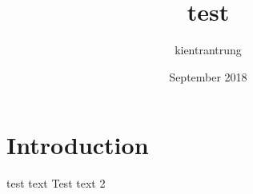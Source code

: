 \documentclass{article}
\title{test}
\author{kientrantrung }
\date{September 2018}
\begin{document}
\maketitle

\section{Introduction}
test text
Test text 2
\end{document}
